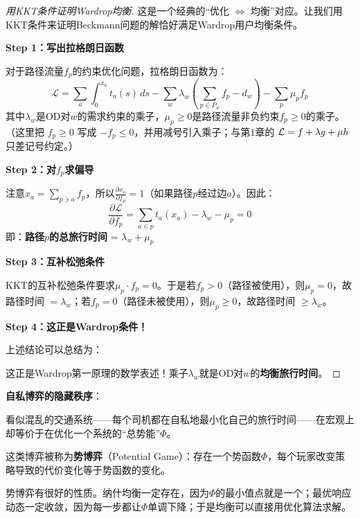 \begin{proof}[用KKT条件证明Wardrop均衡]
这是一个经典的``优化 $\Leftrightarrow$ 均衡''对应。让我们用KKT条件来证明Beckmann问题的解恰好满足Wardrop用户均衡条件。

\textbf{Step 1：写出拉格朗日函数}

对于路径流量$f_p$的约束优化问题，拉格朗日函数为：
\begin{equation}
    \mathcal{L} = \sum_{a} \int_0^{x_a} t_a(s) \, ds - \sum_w \lambda_w \left( \sum_{p \in P_w} f_p - d_w \right) - \sum_p \mu_p f_p
\end{equation}
其中$\lambda_w$是OD对$w$的需求约束的乘子，$\mu_p \geq 0$是路径流量非负约束$f_p \geq 0$的乘子。（这里把 $f_p \ge 0$ 写成 $-f_p \le 0$，并用减号引入乘子；与第1章的 $\mathcal{L} = f + \lambda g + \mu h$ 只差记号约定。）

\textbf{Step 2：对$f_p$求偏导}

注意$x_a = \sum_{p \ni a} f_p$，所以$\frac{\partial x_a}{\partial f_p} = 1$（如果路径$p$经过边$a$）。因此：
\begin{equation}
    \frac{\partial \mathcal{L}}{\partial f_p} = \sum_{a \in p} t_a(x_a) - \lambda_w - \mu_p = 0
\end{equation}
即：\textbf{路径$p$的总旅行时间} = $\lambda_w + \mu_p$

\textbf{Step 3：互补松弛条件}

KKT的互补松弛条件要求$\mu_p \cdot f_p = 0$。于是若$f_p > 0$（路径被使用），则$\mu_p = 0$，故路径时间 $= \lambda_w$；若$f_p = 0$（路径未被使用），则$\mu_p \geq 0$，故路径时间 $\geq \lambda_w$。

\textbf{Step 4：这正是Wardrop条件！}

上述结论可以总结为：
\begin{center}
\end{center}

这正是Wardrop第一原理的数学表述！乘子$\lambda_w$就是OD对$w$的\textbf{均衡旅行时间}。
\end{proof}

\begin{keyinsight}
\textbf{自私博弈的隐藏秩序}：

看似混乱的交通系统——每个司机都在自私地最小化自己的旅行时间——在宏观上却等价于在优化一个系统的``总势能''$\Phi$。

这类博弈被称为\textbf{势博弈}（Potential Game）：存在一个势函数$\Phi$，每个玩家改变策略导致的代价变化等于势函数的变化。

势博弈有很好的性质。纳什均衡一定存在，因为$\Phi$的最小值点就是一个；最优响应动态一定收敛，因为每一步都让$\Phi$单调下降；于是均衡可以直接用优化算法求解。
\end{keyinsight}

